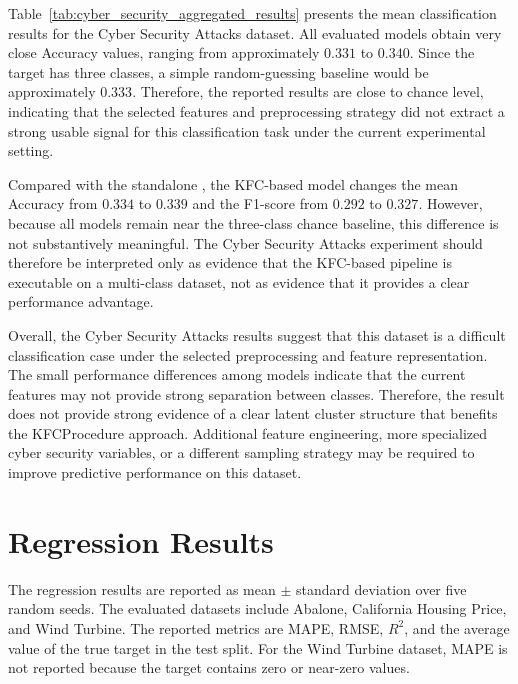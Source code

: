 \hs Table~\ref{tab:cyber_security_aggregated_results} presents the mean classification results for the Cyber Security Attacks dataset. All evaluated models obtain very close Accuracy values, ranging from approximately $0.331$ to $0.340$. Since the target has three classes, a simple random-guessing baseline would be approximately $0.333$. Therefore, the reported results are close to chance level, indicating that the selected features and preprocessing strategy did not extract a strong usable signal for this classification task under the current experimental setting.







Compared with the standalone , the KFC-based model changes the mean Accuracy from $0.334$ to $0.339$ and the F1-score from $0.292$ to $0.327$. However, because all models remain near the three-class chance baseline, this difference is not substantively meaningful. The Cyber Security Attacks experiment should therefore be interpreted only as evidence that the KFC-based pipeline is executable on a multi-class dataset, not as evidence that it provides a clear performance advantage.

Overall, the Cyber Security Attacks results suggest that this dataset is a difficult classification case under the selected preprocessing and feature representation. The small performance differences among models indicate that the current features may not provide strong separation between classes. Therefore, the result does not provide strong evidence of a clear latent cluster structure that benefits the KFCProcedure approach. Additional feature engineering, more specialized cyber security variables, or a different sampling strategy may be required to improve predictive performance on this dataset.

\section{Regression Results}
\label{sec:regression_results}

\hs The regression results are reported as mean $\pm$ standard deviation over five random seeds. The evaluated datasets include Abalone, California Housing Price, and Wind Turbine. The reported metrics are MAPE, RMSE, $R^2$, and the average value of the true target in the test split. For the Wind Turbine dataset, MAPE is not reported because the target contains zero or near-zero values.

